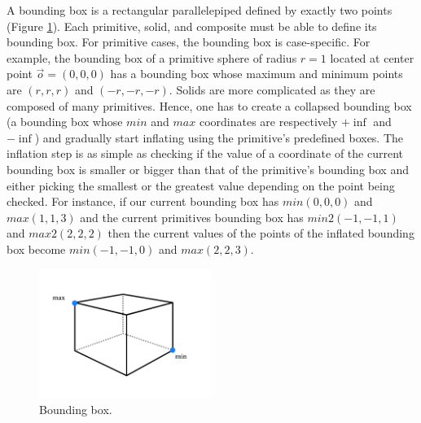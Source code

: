 \documentclass[a4paper,11pt,oneside]{article}
\begin{document}
A bounding box is a rectangular parallelepiped defined by exactly two points (Figure \ref{sec4.2:box-points}). Each primitive, solid, and composite must be able to define its bounding box. For primitive cases, the bounding box is case-specific. For example, the bounding box of a primitive sphere of radius $r = 1$ located at center point $\vec{o} = (0, 0, 0)$ has a bounding box whose maximum and minimum points are $(r, r, r)$ and $(-r, -r, -r)$. Solids are more complicated as they are composed of many primitives. Hence, one has to create a collapsed bounding box (a bounding box whose $min$ and $max$ coordinates are respectively $+\inf$ and $-\inf$) and gradually start inflating using the primitive's predefined boxes. The inflation step is as simple as checking if the value of a coordinate of the current bounding box is smaller or bigger than that of the primitive's bounding box and either picking the smallest or the greatest value depending on the point being checked. For instance, if our current bounding box has $min(0, 0, 0)$ and $max(1, 1, 3)$ and the current primitives bounding box has $min2(-1, -1, 1)$ and $max2(2, 2, 2)$ then the current values of the points of the inflated bounding box become $min(-1, -1, 0)$ and $max(2, 2, 3)$.


\begin{figure}[ht]
	\begin{center}
		\includegraphics[width=0.5\textwidth]{section4/4.2/box-enclosure-points.png}
	\end{center}
	\caption{Bounding box.}
	\label{sec4.2:box-points}
\end{figure}
\end{document}
